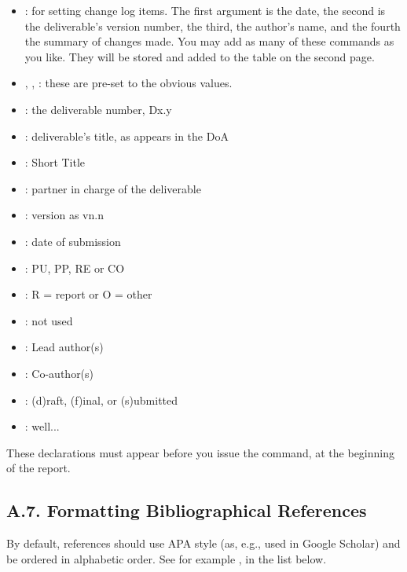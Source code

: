 \begin{itemize}
    \item {}: for setting change log items. The first argument is the date, the second is the deliverable's version number, the third, the author's name, and the   fourth the summary of changes made. You may add as many of these   commands as you like. They will be stored and added to the table on   the second page.  
    \item {}, , : these are pre-set to the obvious values. 
    \item {}: the deliverable number, Dx.y
    \item {}: deliverable's title, as appears in the DoA
    \item {}: Short Title
    \item {}: partner in charge of the deliverable
    \item {}: version as vn.n
    \item {}: date of submission
    \item {}: PU, PP, RE or CO
    \item {}: R = report or O = other
    \item {}: not used
    \item {}: Lead author(s)
    \item {}: Co-author(s)
    \item {}: (d)raft, (f)inal, or (s)ubmitted
    \item {}: well...
\end{itemize}

These declarations must appear before you issue the  command, at the beginning of the report.

\subsection*{A.7. Formatting Bibliographical References}
\label{sec:appendix-a7-formatting-bibliographical-references}

By default, references should use APA style (as, e.g., used in Google Scholar) and be ordered in alphabetic order. See for example \cite{bib:tan2004}, in the list below.

